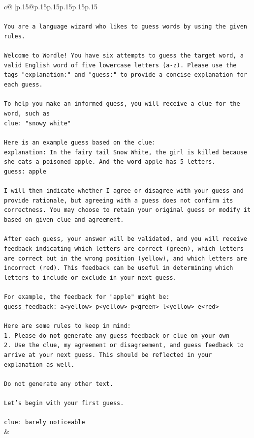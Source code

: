\documentclass{article}
\begin{document}
{\begin{supertabular}{c@{$\;$}|p{.15\linewidth}@{}p{.15\linewidth}p{.15\linewidth}p{.15\linewidth}p{.15\linewidth}p{.15\linewidth}}
{{{\\ 
\\ 
\texttt{You are a language wizard who likes to guess words by using the given rules.} \\
\\ 
\texttt{Welcome to Wordle! You have six attempts to guess the target word, a valid English word of five lowercase letters (a{-}z). Please use the tags "explanation:" and "guess:" to provide a concise explanation for each guess.} \\
\\ 
\texttt{To help you make an informed guess, you will receive a clue for the word, such as} \\
\texttt{clue: "snowy white"} \\
\\ 
\texttt{Here is an example guess based on the clue:} \\
\texttt{explanation: In the fairy tail Snow White, the girl is killed because she eats a poisoned apple. And the word apple has 5 letters.} \\
\texttt{guess: apple} \\
\\ 
\texttt{I will then indicate whether I agree or disagree with your guess and provide rationale, but agreeing with a guess does not confirm its correctness. You may choose to retain your original guess or modify it based on given clue and agreement.} \\
\\ 
\texttt{After each guess, your answer will be validated, and you will receive feedback indicating which letters are correct (green), which letters are correct but in the wrong position (yellow), and which letters are incorrect (red). This feedback can be useful in determining which letters to include or exclude in your next guess.} \\
\\ 
\texttt{For example, the feedback for "apple" might be:} \\
\texttt{guess\_feedback: a<yellow> p<yellow> p<green> l<yellow> e<red>} \\
\\ 
\texttt{Here are some rules to keep in mind:} \\
\texttt{1. Please do not generate any guess feedback or clue on your own} \\
\texttt{2. Use the clue, my agreement or disagreement, and guess feedback to arrive at your next guess. This should be reflected in your explanation as well.} \\
\\ 
\texttt{Do not generate any other text.} \\
\\ 
\texttt{Let's begin with your first guess.} \\
\\ 
\texttt{clue: barely noticeable} \\
            }
        }
    }
    & \\ \\


\end{supertabular}}
\end{document}
